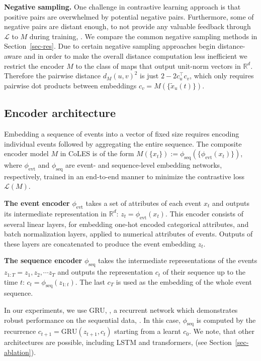 \documentclass[sigconf]{acmart}
\newcommand{\R}{\mathbb{R}}
\newcommand{\revised}[1]{#1}
\begin{document}
\textbf{Negative sampling.} One challenge in contrastive learning approach is that positive pairs
are overwhelmed by potential negative pairs. Furthermore, some of negative pairs are distant enough,
to not provide any valuable feedback through $\mathcal{L}$ to $M$ during training, \citep{SimoSerra2015DiscriminativeLO,Schroff2015FaceNetAU}. We compare the common negative sampling
methods in Section~\ref{sec-res}. Due to certain negative sampling approaches begin distance-aware
and in order to make the overall distance computation less inefficient we restrict the encoder $M$
to the class of maps that output unit-norm vectors in $\R^d$. Therefore the pairwise distance $
    d_M(u, v)^2
$ is just $2 - 2 c_u^\top c_v$, which only requires pairwise dot products between embeddings $
    c_v = M(\{\tilde{x}_u(t)\})
$.

\subsection{Encoder architecture} \label{sec-enc-arch}

Embedding a sequence of events into a vector of fixed size requires encoding individual events
followed by aggregating the entire sequence. The composite encoder model $M$ in CoLES is of
the form $
    M(\{x_t\})
        := \phi_{\mathrm{seq}}(
            \{\phi_{\mathrm{evt}}(x_t)\}
        )
$, where $\phi_{\mathrm{evt}}$ and $\phi_{\mathrm{seq}}$ are event- and sequence-level
embedding networks, respectively, trained in an end-to-end manner to minimize the contrastive
loss  $\mathcal{L}(M)$.

\textbf{The event encoder} $\phi_{\mathrm{evt}}$ takes a set of attributes of each event $x_t$
and outputs its intermediate representation in $\R^d$: $z_t = \phi_{\mathrm{evt}}(x_t)$. This
encoder consists of several linear layers, for embedding one-hot encoded categorical attributes,
and batch normalization layers, applied to numerical attributes of events. Outputs of these
layers are concatenated to produce the event embedding $z_t$.

\textbf{The sequence encoder} $\phi_{\mathrm{seq}}$ takes the intermediate representations of
the events $ z_{1:T} = z_1, z_2, \cdots z_T $ and outputs the representation $c_t$ of their
sequence up to the time $t$: $c_t = \phi_{\mathrm{seq}}(z_{1:t})$. The last $c_T$ is used
as the embedding of the whole event sequence.
\revised{
    In our experiments, we use GRU, \citep{Cho2014OnTP}, a recurrent network which demonstrates
    robust performance on the sequential data, \citep{Babaev2019ETRNNAD}. In this case,
    $\phi_{\mathrm{seq}}$ is computed by the recurrence $c_{t+1} = \mathrm{GRU}(z_{t+1}, c_t)$
    starting from a learnt $c_0$. We note, that other architectures are possible, including
    LSTM and transformers, \citep{Hochreiter1997LongSM,Vaswani2017AttentionIA}
    (see Section~\ref{sec-ablation}).
}
\end{document}
